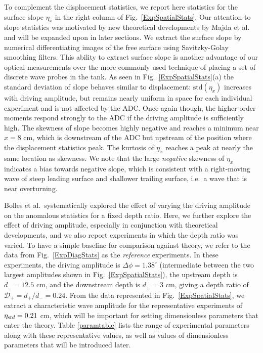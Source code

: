 \documentclass[11pt]{article}
\newcommand{\etastd}{\eta_{\text std}}
\newcommand{\depth}{d}
\newcommand{\dup}{\depth_{-}}
\newcommand{\ddn}{\depth_{+}}
\newcommand{\drat}{\mathcal{D}}
\newcommand{\dratdn}{\drat_+}
\newcommand{\std}{\text{std}}
\newcommand{\Dphi}{\Delta \phi}
\begin{document}
	To complement the displacement statistics, we report here statistics for the surface slope $\eta_x$ in the right column of Fig.~\ref{ExpSpatialStats}. Our attention to slope statistics was motivated by new theoretical developments by Majda et al.~\cite{majda2019} and will be expanded upon in later sections. We extract the surface slope by numerical differentiating images of the free surface using Savitzky-Golay smoothing filters. This ability to extract surface slope is another advantage of our optical measurements over the more commonly used technique of placing a set of discrete wave probes in the tank. As seen in Fig.~\ref{ExpSpatialStats}(a) the standard deviation of slope behaves similar to displacement: $\std(\eta_x)$ increases with driving amplitude, but remains nearly uniform in space for each individual experiment and is not affected by the ADC. Once again though, the higher-order moments respond strongly to the ADC if the driving amplitude is sufficiently high. The skewness of slope becomes highly negative and reaches a minimum near $x = 8$ cm, which is downstream of the ADC but upstream of the position where the displacement statistics peak. The kurtosis of $\eta_x$ reaches a peak at nearly the same location as skewness. We note that the large {\em negative} skewness of $\eta_x$ indicates a bias towards negative slope, which is consistent with a right-moving wave of steep leading surface and shallower trailing surface, i.e.~a wave that is near overturning.

	Bolles et al.~systematically explored the effect of varying the driving amplitude on the anomalous statistics for a fixed depth ratio. 
Here, we further explore the effect of driving amplitude, especially in conjunction with theoretical developments, and we also report experiments in which the depth ratio was varied. 
To have a simple baseline for comparison against theory, we refer to the data from Fig.~\ref{ExpDiagStats} as the {\em reference} experiments. In these experiments, the driving amplitude is $\Dphi = 1.38^{\circ}$ (intermediate between the two largest amplitudes shown in Fig.~\ref{ExpSpatialStats}), the upstream depth is $\dup = 12.5$ cm, and the downstream depth is $\ddn = 3$ cm, giving a depth ratio of $\dratdn = \ddn/\dup= 0.24$. From the data represented in Fig.~\ref{ExpSpatialStats}, we extract a characteristic wave amplitude for the representative experiments of $\etastd = 0.21$ cm, which will be important for setting dimensionless parameters that enter the theory. Table \ref{paramtable} lists the range of experimental parameters along with these representative values, as well as values of dimensionless parameters that will be introduced later.
\end{document}
